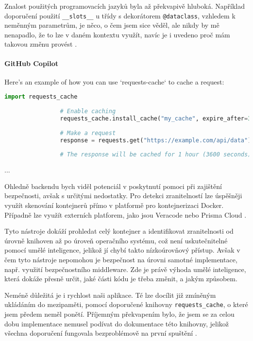 \documentclass[FM,DP]{tulthesis}
\begin{document}
		Znalost použitých programovacích jazyků byla až překvapivě hluboká. Například doporučení použití \verb|__slots__| u třídy s dekorátorem \verb|@dataclass|, vzhledem k neměnným parametrům, je něco, o čem jsem sice věděl, ale nikdy by mě nenapadlo, že to lze v daném kontextu využít, navíc je i uvedeno proč mám takovou změnu provést \cite{dataclass}.
		
		\vspace{0.6em}
		\begin{tcolorbox}[colback=white,colframe=black,title=Úprava výkonnosti třídy v Pythonu]
			\paragraph{GitHub Copilot}
			Here's an example of how you can use `requests-cache` to cache a request:
			
			\begin{lstlisting}[language=Python]
				import requests_cache
				
				# Enable caching
				requests_cache.install_cache("my_cache", expire_after=3600)
				
				# Make a request
				response = requests.get("https://example.com/api/data")
				
				# The response will be cached for 1 hour (3600 seconds)
			\end{lstlisting}
			... \cite{requests_cache}
		\end{tcolorbox}
		
		Ohledně backendu bych viděl potenciál v poskytnutí pomoci při zajištění bezpečnosti, avšak s určitými nedostatky. Pro detekci zranitelností lze úspěšněji využít skenování kontejnerů přímo v platformě pro kontejnerizaci Docker. Případně lze využít externích platforem, jako jsou Veracode nebo Prisma Cloud \cite{veracode} \cite{prisma_cloud} \cite{docker}. 

    Tyto nástroje dokáží prohledat celý kontejner a identifikovat zranitelnosti od úrovně knihoven až po úroveň operačního systému, což není uskutečnitelné pomocí umělé inteligence, jelikož jí chybí takto nízkoúrovňový přístup. Avšak v čem tyto nástroje nepomohou je bezpečnost na úrovni samotné implementace, např. využití bezpečnostního middleware. Zde je právě výhoda umělé inteligence, která dokáže přesně určit, jaké části kódu je třeba změnit, a jakým způsobem. 

    Neméně důležitá je i rychlost naši aplikace. Té lze docílit již zmíněným ukládáním do mezipaměti, pomocí doporučené knihovny \verb|requests_cache|, o které jsem předem neměl ponětí. Příjemným překvapením bylo, že jsem se za celou dobu implementace nemusel podívat do dokumentace této knihovny, jelikož všechna doporučení fungovala bezproblémově na první spuštění \cite{webapp_basics} \cite{middleware}.
		
\end{document}
